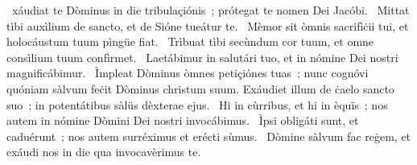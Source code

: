 { }
{%
~xáudiat te Dòminus in die tribulaçiónis~; prótegat te nomen Dei Jacóbi. 
~Mittat tìbi auxìlium de sancto, et de Sióne tueátur te. 
~Mèmor sit òmnis sacrifìċii tui, et holocáustum tuum pìngüe fiat. 
~Trìbuat tìbi secùndum cor tuum, et omne consìlium tuum confìrmet. 
~Laetábimur in salutári tuo, et in nómine Dei nostri magnificábimur. 
~Ìmpleat Dòminus òmnes petiçiónes tuas~; nunc cognóvi quóniam sàlvum feċit Dòminus christum suum. Exáudiet illum de ċaelo sancto suo~; in potentátibus sàlüs dèxterae ejus. 
~Hi in cùrribus, et hi in èquïs~; nos autem in nómine Dòmini Dei nostri invocábimus. 
~Ìpsi obligáti sunt, et caduérunt~; nos autem surréximus et erécti sùmus. 
~Dòmine sàlvum fac reġem, et exáudi nos in die qua invocavèrimus te. 
}
